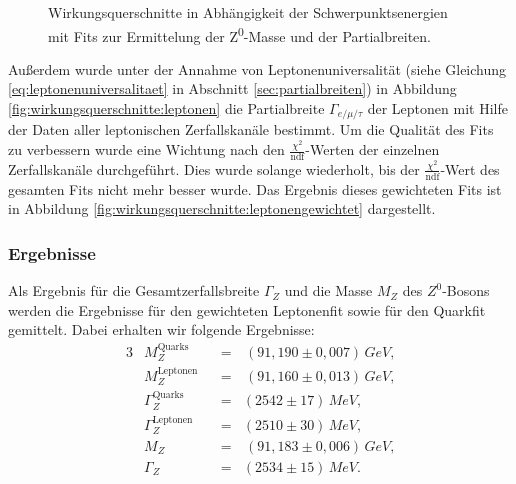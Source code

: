\begin{figure}
	\caption[Wirkungsquerschnitte in Abhängigkeit der Schwerpunktsenergien]{Wirkungsquerschnitte in Abhängigkeit der Schwerpunktsenergien mit Fits zur Ermittelung der Z\textsuperscript0-Masse und der Partialbreiten.}
	\label{fig:wirkungsquerschnitte}
\end{figure}

Außerdem wurde unter der Annahme von Leptonenuniversalität (siehe Gleichung \ref{eq:leptonenuniversalitaet} in Abschnitt \ref{sec:partialbreiten}) in Abbildung \ref{fig:wirkungsquerschnitte:leptonen} die Partialbreite $\Gamma_{e/\mu/\tau}$ der Leptonen mit Hilfe der Daten aller leptonischen Zerfallskanäle bestimmt. Um die Qualität des Fits zu verbessern wurde eine Wichtung nach den $\frac{\chi^2}{\mathrm{ndf}}$-Werten der einzelnen Zerfallskanäle durchgeführt. Dies wurde solange wiederholt, bis der $\frac{\chi^2}{\mathrm{ndf}}$-Wert des gesamten Fits nicht mehr besser wurde. Das Ergebnis dieses gewichteten Fits ist in Abbildung \ref{fig:wirkungsquerschnitte:leptonengewichtet} dargestellt.

\subsubsection{Ergebnisse}

Als Ergebnis für die Gesamtzerfallsbreite $\Gamma_Z$ und die Masse $M_Z$ des $Z^0$-Bosons werden die Ergebnisse für den gewichteten Leptonenfit sowie für den Quarkfit gemittelt. Dabei erhalten wir folgende Ergebnisse:
\begin{alignat}{3}
	&M_Z^\text{Quarks}&&=&\,(91,190\pm0,007)\,\si{GeV}\text{,}\\
	&M_Z^\text{Leptonen}&&=&\,(91,160\pm0,013)\,\si{GeV}\text{,}\\
	&\Gamma_Z^\text{Quarks}&&=&(2542\pm17)\,\si{MeV}\text{,}\\
	&\Gamma_Z^\text{Leptonen}&&=&(2510\pm30)\,\si{MeV}\text{,}\\
	&M_Z&&=&\,(91,183\pm0,006)\,\si{GeV}\text{,}\\
	&\Gamma_Z&&=&(2534\pm15)\,\si{MeV}\text{.}
\end{alignat}

